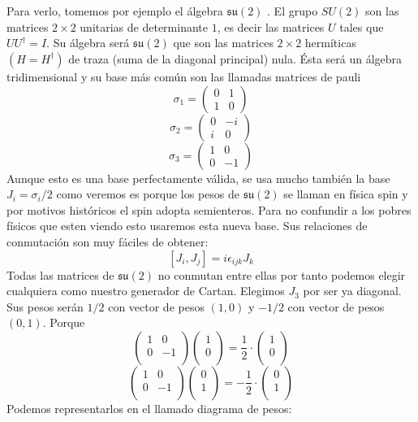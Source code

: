 \documentclass[12pt]{article}
\begin{document}
\\\\ Para verlo, tomemos por ejemplo el álgebra  
$\mathfrak{s}\mathfrak{u}(2)$ . El grupo $SU(2)$ son las matrices $2\times 2$ unitarias de determinante $1$, es decir las matrices $U$ tales que $U U^\dagger=I$. Su álgebra será $\mathfrak{s}\mathfrak{u}(2)$ que son las matrices $2\times2$ hermíticas $(H=H^\dagger)$ de traza (suma de la diagonal principal) nula. Ésta será un álgebra tridimensional y su base más común son las llamadas matrices de pauli 
$$\sigma_1= \begin{pmatrix}
    0 & 1 \\ 1 & 0
\end{pmatrix}$$
$$\sigma_2=\begin{pmatrix}
    0 & -i \\ i & 0
\end{pmatrix}$$
$$\sigma_3=\begin{pmatrix}
    1 & 0 \\ 0 & -1
\end{pmatrix}$$
Aunque esto es una base perfectamente válida, se usa mucho también la base $J_i=\sigma_i/2 $ como veremos es porque los pesos de $\mathfrak{s}\mathfrak{u}(2)$ se llaman en física spin y por motivos históricos el spin adopta semienteros. Para no confundir a los pobres físicos que esten viendo esto usaremos esta nueva base. Sus relaciones de conmutación son muy fáciles de obtener:
$$[J_i,J_j]=i\epsilon_{ijk} J_k$$
Todas las matrices de $\mathfrak{s}\mathfrak{u}(2)$ no conmutan entre ellas por tanto podemos elegir cualquiera como nuestro generador de Cartan. Elegimos $J_3$ por ser ya diagonal. Sus pesos serán $1/2$ con vector de pesos $(1,0)$ y $-1/2$ con vector de pesos $(0,1)$. Porque 
$$\begin{pmatrix}
    1 & 0 \\ 0 & -1\\
\end{pmatrix} \begin{pmatrix}
    1 \\ 0\\
\end{pmatrix} =\frac{1}{2}\cdot \begin{pmatrix}
    1 \\ 0\\
\end{pmatrix}$$
$$\begin{pmatrix}
    1 & 0 \\ 0 & -1\\
\end{pmatrix} \begin{pmatrix}
    0 \\ 1\\
\end{pmatrix} =-\frac{1}{2}\cdot \begin{pmatrix}
    0 \\ 1\\
\end{pmatrix}$$
Podemos representarlos en el llamado diagrama de pesos:
\end{document}
